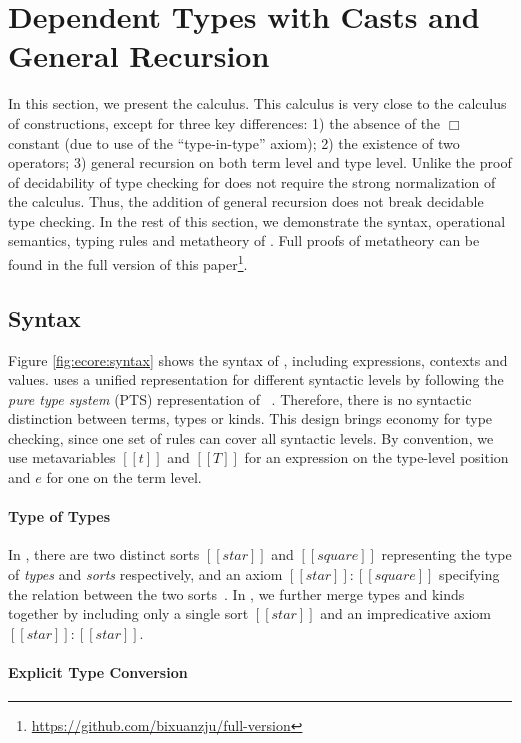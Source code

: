 
\section{Dependent Types with Casts and General Recursion}\label{sec:ecore}

In this section, we present the \name calculus. This calculus is very
close to the calculus of constructions, except for three key differences:
1) the absence of the $\Box$ constant (due to use of the
``type-in-type'' axiom); 2) the existence of two \cast operators; 3)
general recursion on both term level and type level.
Unlike \cc the proof of 
decidability of type checking for \name does not require the strong normalization of the
calculus. Thus, the addition of general recursion does not break decidable
type checking. In the rest of this section, we demonstrate the syntax,
operational semantics, typing rules and metatheory of \name.
Full proofs of metatheory can be found in the full version of this paper\footnote{\url{https://github.com/bixuanzju/full-version}}.

\subsection{Syntax}\label{sec:ecore:syn}

Figure \ref{fig:ecore:syntax} shows the syntax of \name, including
expressions, contexts and values. \name uses a unified 
representation for different syntactic levels by following the
\emph{pure type system} (PTS) representation of \cc~\cite{handbook}. Therefore, there
is no syntactic distinction between terms, types or kinds. This design
brings economy for type checking, since one set of rules can cover
all syntactic levels. By convention, we use metavariables $[[t]]$ and
$[[T]]$ for an expression on the type-level position and $e$ for one
on the term level.

\paragraph{Type of Types}
In \cc, there are two distinct sorts $[[star]]$ and
$[[square]]$ representing the type of \emph{types} and \emph{sorts}
respectively, and an axiom $[[star]]:[[square]]$ specifying the
relation between the two sorts~\cite{handbook}. In \name, we further merge types and
kinds together by including only a single sort $[[star]]$ and an
impredicative axiom $[[star]]:[[star]]$.

\paragraph{Explicit Type Conversion}

